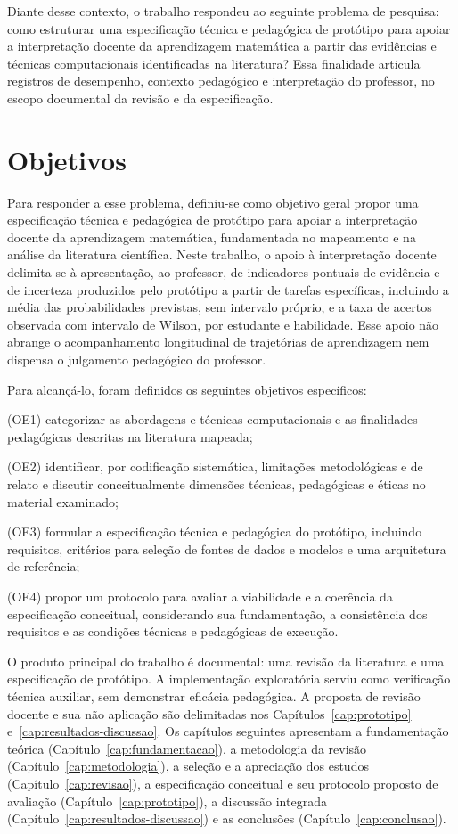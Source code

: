 Diante desse contexto, o trabalho respondeu ao seguinte problema de pesquisa: como estruturar uma especificação técnica e pedagógica de protótipo para apoiar a interpretação docente da aprendizagem matemática a partir das evidências e técnicas computacionais identificadas na literatura?
Essa finalidade articula registros de desempenho, contexto pedagógico e interpretação do professor, no escopo documental da revisão e da especificação.

\section{Objetivos}

Para responder a esse problema, definiu-se como objetivo geral propor uma especificação técnica e pedagógica de protótipo para apoiar a interpretação docente da aprendizagem matemática, fundamentada no mapeamento e na análise da literatura científica. Neste trabalho, o apoio à interpretação docente delimita-se à apresentação, ao professor, de indicadores pontuais de evidência e de incerteza produzidos pelo protótipo a partir de tarefas específicas, incluindo a média das probabilidades previstas, sem intervalo próprio, e a taxa de acertos observada com intervalo de Wilson, por estudante e habilidade. Esse apoio não abrange o acompanhamento longitudinal de trajetórias de aprendizagem nem dispensa o julgamento pedagógico do professor.

Para alcançá-lo, foram definidos os seguintes objetivos específicos:
\begin{alineas}
\item (OE1) categorizar as abordagens e técnicas computacionais e as finalidades pedagógicas descritas na literatura mapeada;
\item (OE2) identificar, por codificação sistemática, limitações metodológicas e de relato e discutir conceitualmente dimensões técnicas, pedagógicas e éticas no material examinado;
\item (OE3) formular a especificação técnica e pedagógica do protótipo, incluindo requisitos, critérios para seleção de fontes de dados e modelos e uma arquitetura de referência;
\item (OE4) propor um protocolo para avaliar a viabilidade e a coerência da especificação conceitual, considerando sua fundamentação, a consistência dos requisitos e as condições técnicas e pedagógicas de execução.
\end{alineas}

O produto principal do trabalho é documental: uma revisão da literatura e uma especificação de protótipo. A implementação exploratória serviu como verificação técnica auxiliar, sem demonstrar eficácia pedagógica. A proposta de revisão docente e sua não aplicação são delimitadas nos Capítulos~\ref{cap:prototipo} e~\ref{cap:resultados-discussao}. Os capítulos seguintes apresentam a fundamentação teórica (Capítulo~\ref{cap:fundamentacao}), a metodologia da revisão (Capítulo~\ref{cap:metodologia}), a seleção e a apreciação dos estudos (Capítulo~\ref{cap:revisao}), a especificação conceitual e seu protocolo proposto de avaliação (Capítulo~\ref{cap:prototipo}), a discussão integrada (Capítulo~\ref{cap:resultados-discussao}) e as conclusões (Capítulo~\ref{cap:conclusao}).

